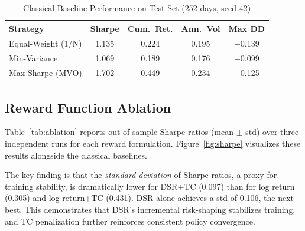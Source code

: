 \documentclass[conference]{IEEEtran}
\begin{document}
\begin{table}[t]
\caption{Classical Baseline Performance on Test Set (252 days, seed 42)}
\label{tab:baselines}
\centering
\begin{tabular}{lcccc}
\toprule
Strategy & Sharpe & Cum.\ Ret. & Ann.\ Vol & Max DD \\
\midrule
Equal-Weight (1/N) & 1.135 & 0.224 & 0.195 & $-$0.139 \\
Min-Variance       & 1.069 & 0.189 & 0.176 & $-$0.099 \\
Max-Sharpe (MVO)   & 1.702 & 0.449 & 0.234 & $-$0.125 \\
\bottomrule
\end{tabular}
\end{table}

\subsection{Reward Function Ablation}
Table~\ref{tab:ablation} reports out-of-sample Sharpe ratios (mean $\pm$ std)
over three independent runs for each reward formulation. Figure~\ref{fig:sharpe}
visualizes these results alongside the classical baselines.

\begin{table}[t]
\caption{Out-of-Sample Sharpe Ratio by Reward Function (3 runs each)}
\label{tab:ablation}
\centering
{}
\end{table}

The key finding is that the \emph{standard deviation} of Sharpe ratios, a proxy
for training stability, is dramatically lower for DSR+TC (0.097) than for log
return (0.305) and log return+TC (0.431). DSR alone achieves a std of 0.106, the
next best. This demonstrates that DSR's incremental risk-shaping stabilizes
training, and TC penalization further reinforces consistent policy convergence.
\end{document}
